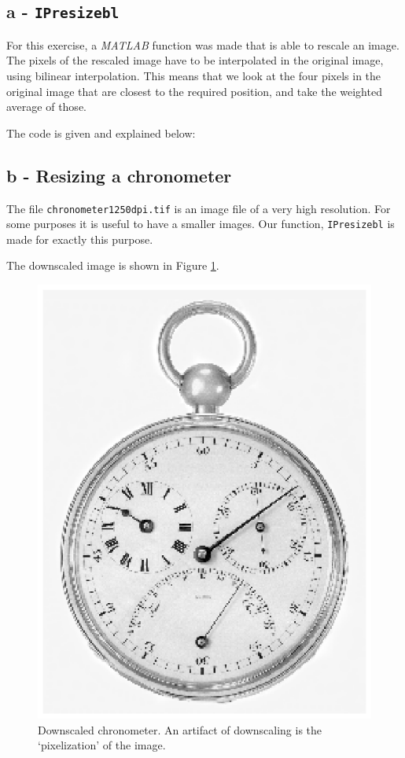 \subsection*{a - \texttt{IPresizebl}}
For this exercise, a \textit{MATLAB} function was made that is able to rescale an image.
The pixels of the rescaled image have to be interpolated in the original image, using bilinear interpolation.
This means that we look at the four pixels in the original image that are closest to the required position, and take the weighted average of those.

The code is given and explained below:

\subsection*{b - Resizing a chronometer}
The file \texttt{chronometer1250dpi.tif} is an image file of a very high resolution.
For some purposes it is useful to have a smaller images.
Our function, \texttt{IPresizebl} is made for exactly this purpose.

The downscaled image is shown in Figure \ref{fig:chrono_down}.

\begin{figure}[!Htb]
 \centering
 \includegraphics{scaledDownChrono.eps}
 \caption{Downscaled chronometer. An artifact of downscaling is the `pixelization' of the image.}
 \label{fig:chrono_down}
\end{figure}

